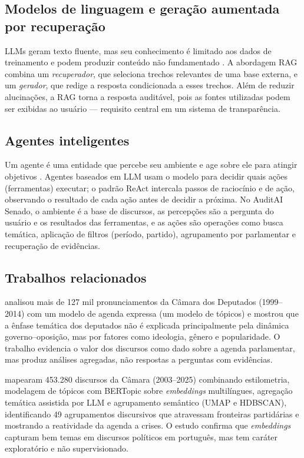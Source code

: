 \documentclass[12pt]{article}
\begin{document}
\subsection{Modelos de linguagem e geração aumentada por recuperação}

LLMs geram texto fluente, mas seu conhecimento é limitado aos dados de treinamento e podem
produzir conteúdo não fundamentado \cite{ji2023}. A abordagem RAG \cite{lewis2020} combina um
\emph{recuperador}, que seleciona trechos relevantes de uma base externa, e um \emph{gerador}, que
redige a resposta condicionada a esses trechos. Além de reduzir alucinações, a RAG torna a
resposta auditável, pois as fontes utilizadas podem ser exibidas ao usuário --- requisito central
em um sistema de transparência.

\subsection{Agentes inteligentes}

Um agente é uma entidade que percebe seu ambiente e age sobre ele para atingir objetivos
\cite{russell2022}. Agentes baseados em LLM usam o modelo para decidir quais ações (ferramentas)
executar; o padrão ReAct \cite{yao2023} intercala passos de raciocínio e de ação, observando o
resultado de cada ação antes de decidir a próxima. No AuditAI Senado, o ambiente é a base de
discursos, as percepções são a pergunta do usuário e os resultados das ferramentas, e as ações
são operações como busca temática, aplicação de filtros (período, partido), agrupamento por
parlamentar e recuperação de evidências.

\subsection{Trabalhos relacionados}

\cite{moreira2020} analisou mais de
127 mil pronunciamentos da Câmara dos Deputados (1999--2014) com um modelo de agenda expressa (um
modelo de tópicos) e mostrou que a ênfase temática dos deputados não é explicada principalmente
pela dinâmica governo--oposição, mas por fatores como ideologia, gênero e popularidade. O
trabalho evidencia o valor dos discursos como dado sobre a agenda parlamentar, mas produz
análises agregadas, não respostas a perguntas com evidências.

\cite{soriano2026} mapearam 453.280 discursos da Câmara (2003--2025) combinando estilometria,
modelagem de tópicos com BERTopic sobre \textit{embeddings} multilíngues, agregação temática
assistida por LLM e agrupamento semântico (UMAP e HDBSCAN), identificando 49 agrupamentos
discursivos que atravessam fronteiras partidárias e mostrando a reatividade da agenda a crises. O
estudo confirma que \textit{embeddings} capturam bem temas em discursos políticos em português,
mas tem caráter exploratório e não supervisionado.
\end{document}
